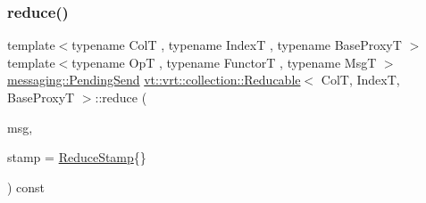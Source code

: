 \mbox{\label{structvt_1_1vrt_1_1collection_1_1_reducable_a3333825bf69de10656ca60eeddff773d}} 
\subsubsection{\texorpdfstring{reduce()}{reduce()}\hspace{0.1cm}{\footnotesize\ttfamily [4/6]}}
{\footnotesize\ttfamily template$<$typename ColT , typename IndexT , typename Base\+ProxyT $>$ \\
template$<$typename OpT , typename FunctorT , typename MsgT $>$ \\
\hyperlink{structvt_1_1messaging_1_1_pending_send}{messaging\+::\+Pending\+Send} \hyperlink{structvt_1_1vrt_1_1collection_1_1_reducable}{vt\+::vrt\+::collection\+::\+Reducable}$<$ ColT, IndexT, Base\+ProxyT $>$\+::reduce (\begin{DoxyParamCaption}\item[{MsgT $\ast$const}]{msg,  }\item[{\hyperlink{structvt_1_1vrt_1_1collection_1_1_reducable_a19f80baf23f36dad4948ef07322fd0cb}{Reduce\+Stamp}}]{stamp = {\ttfamily \hyperlink{structvt_1_1vrt_1_1collection_1_1_reducable_a19f80baf23f36dad4948ef07322fd0cb}{Reduce\+Stamp}\{\}} }\end{DoxyParamCaption}) const\hspace{0.3cm}{\ttfamily [inline]}}

\mbox{\label{structvt_1_1vrt_1_1collection_1_1_reducable_adec41c02a8c43b709884107d96b729e4}} 
